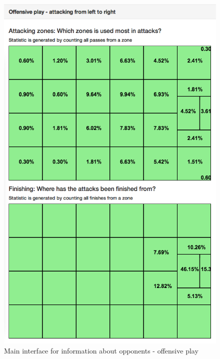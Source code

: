 \begin{figure}[ht!]
\centering
\includegraphics[width=1\textwidth]{images/general/team_analysis2.png}
\caption{Main interface for information about opponents - offensive play}
\label{fig:team_analysis2}
\end{figure}


